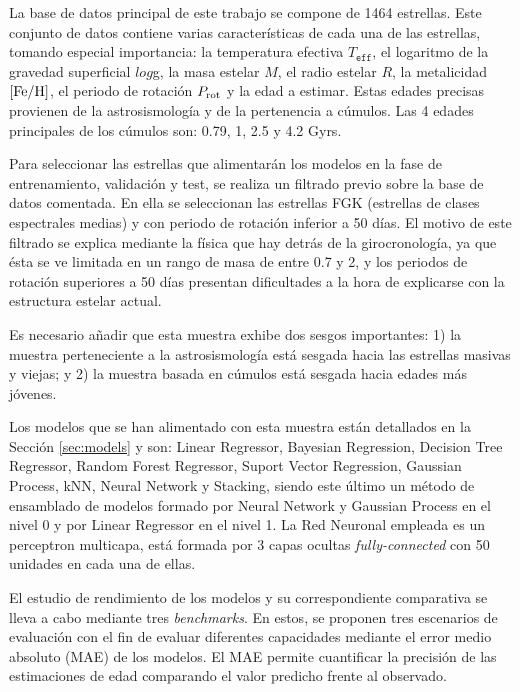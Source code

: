 \vspace{0.5cm}
La base de datos principal de este trabajo se compone de 1464 estrellas. Este conjunto de datos contiene varias características de cada una de las estrellas, tomando especial importancia: la temperatura efectiva $T_\texttt{eff}$, el logaritmo de la gravedad superficial $log$g, la masa estelar $M$, el radio estelar $R$, la metalicidad ${\rm [Fe/H]}$, el periodo de rotación $P_{\rm rot}$ y la edad a estimar. Estas edades precisas provienen de la astrosismología y de la pertenencia a cúmulos. Las 4 edades principales de los cúmulos son: 0.79, 1, 2.5 y 4.2 Gyrs.

Para seleccionar las estrellas que alimentarán los modelos en la fase de entrenamiento, validación y test, se realiza un filtrado previo sobre la base de datos comentada. En ella se seleccionan las estrellas FGK (estrellas de clases espectrales medias) y con periodo de rotación inferior a 50 días. El motivo de este filtrado se explica mediante la física que hay detrás de la girocronología, ya que ésta se ve limitada en un rango de masa de entre 0.7 y 2, y los periodos de rotación superiores a 50 días presentan dificultades a la hora de explicarse con la estructura estelar actual.

Es necesario añadir que esta muestra exhibe dos sesgos importantes: 1) la muestra perteneciente a la astrosismología está sesgada hacia las estrellas masivas y viejas; y 2) la muestra basada en cúmulos está sesgada hacia edades más jóvenes.

\vspace{0.5cm}

Los modelos que se han alimentado con esta muestra están detallados en la Sección \ref{sec:models} y son: Linear Regressor, Bayesian Regression, Decision Tree Regressor, Random Forest Regressor, Suport Vector Regression, Gaussian Process, kNN, Neural Network y Stacking, siendo este último un método de ensamblado de modelos formado por Neural Network y Gaussian Process en el nivel 0 y por Linear Regressor en el nivel 1. La Red Neuronal empleada es un perceptron multicapa, está formada por 3 capas ocultas \emph{fully-connected} con 50 unidades en cada una de ellas.

El estudio de rendimiento de los modelos y su correspondiente comparativa se lleva a cabo mediante tres \emph{benchmarks}. En estos, se proponen tres escenarios de evaluación con el fin de evaluar diferentes capacidades mediante el error medio absoluto (MAE) de los modelos. El MAE permite cuantificar la precisión de las estimaciones de edad comparando el valor predicho frente al observado.

